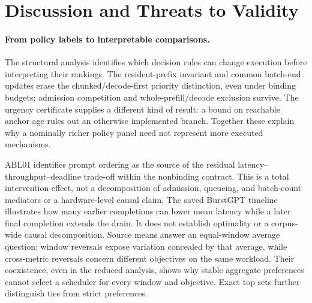 \section{Discussion and Threats to Validity}\label{sec:discussion}
\paragraph{From policy labels to interpretable comparisons.}
The structural analysis identifies which decision rules can change execution
before interpreting their rankings. The resident-prefix invariant and common batch-end
updates erase the chunked/decode-first priority distinction, even under
binding budgets; admission
competition and whole-prefill/decode exclusion survive. The urgency
certificate supplies a different kind of result: a bound on reachable
anchor age rules out an otherwise implemented branch. Together these
explain why a nominally richer policy panel need not represent more
executed mechanisms.

ABL01 identifies prompt ordering as the source of the residual
latency--throughput--deadline trade-off within the nonbinding contract.
This is a total intervention effect, not a decomposition of admission,
queueing, and batch-count mediators or a hardware-level causal claim. The saved
BurstGPT timeline illustrates how many earlier completions can lower mean
latency while a later final completion extends the drain. It does not
establish optimality or a corpus-wide causal decomposition. Source means
answer an equal-window average question; window reversals expose variation
concealed by that average, while cross-metric reversals concern different
objectives on the same workload. Their coexistence, even in the reduced
analysis, shows why stable aggregate preferences cannot select a scheduler
for every window and objective. Exact top sets further distinguish ties
from strict preferences.

